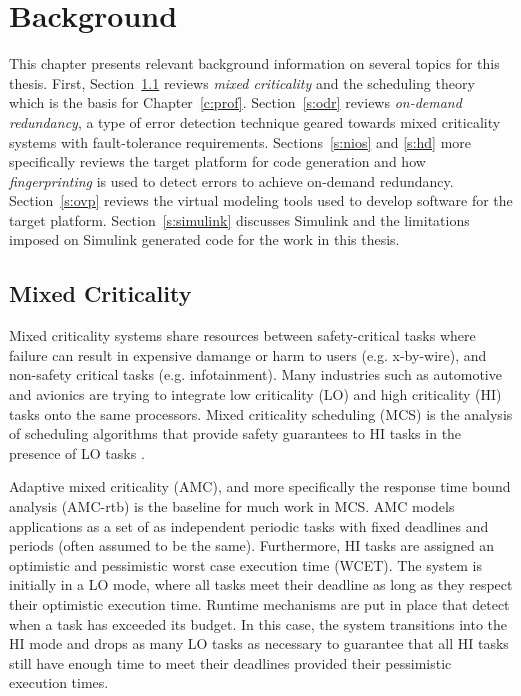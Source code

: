 
\chapter{Background} %

\label{c:background} %


	This chapter presents relevant background information on several topics for this thesis. 
	First, Section~\ref{s:mixedcriticality} reviews \emph{mixed criticality} and the scheduling theory which is the basis for Chapter~\ref{c:prof}. 
	Section~\ref{s:odr} reviews \emph{on-demand redundancy}, a type of error detection technique geared towards mixed criticality systems with fault-tolerance requirements. 
	Sections~\ref{s:nios} and \ref{s:hd} more specifically reviews the target platform for code generation and how \emph{fingerprinting} is used to detect errors to achieve on-demand redundancy.
	Section~\ref{s:ovp} reviews the virtual modeling tools used to develop software for the target platform.
	Section~\ref{s:simulink} discusses Simulink and the limitations imposed on Simulink generated code for the work in this thesis.
	

\section{Mixed Criticality}
\label{s:mixedcriticality}
	Mixed criticality systems share resources between safety-critical tasks where failure can result in expensive damange or harm to users (e.g. x-by-wire), and non-safety critical tasks (e.g. infotainment). 
	Many industries such as automotive and avionics are trying to integrate low criticality (LO) and high criticality (HI) tasks onto the same processors.
	Mixed criticality scheduling (MCS) is the analysis of scheduling algorithms that provide safety guarantees to HI tasks in the presence of LO tasks \cite{burns2013mixed}.
	
	Adaptive mixed criticality (AMC), and more specifically the response time bound analysis (AMC-rtb) \cite{baruah2011response} is the baseline for much work in MCS. 
	AMC models applications as a set of as independent periodic tasks with fixed deadlines and periods (often assumed to be the same).
	Furthermore, HI tasks are assigned an optimistic and pessimistic worst case execution time (WCET). 
	The system is initially in a LO mode, where all tasks meet their deadline as long as they respect their optimistic execution time.
	Runtime mechanisms are put in place that detect when a task has exceeded its budget.
	In this case, the system transitions into the HI mode and drops as many LO tasks as necessary to guarantee that all HI tasks still have enough time to meet their deadlines provided their pessimistic execution times. 
	
